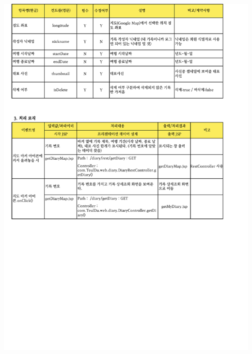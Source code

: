 {{{{{{{{{{{{{{\includegraphics[width=20cm]{./Figure/Analysis/Display/diary/diary_13.pdf} \\
}}}}}}}}}}}}}}
